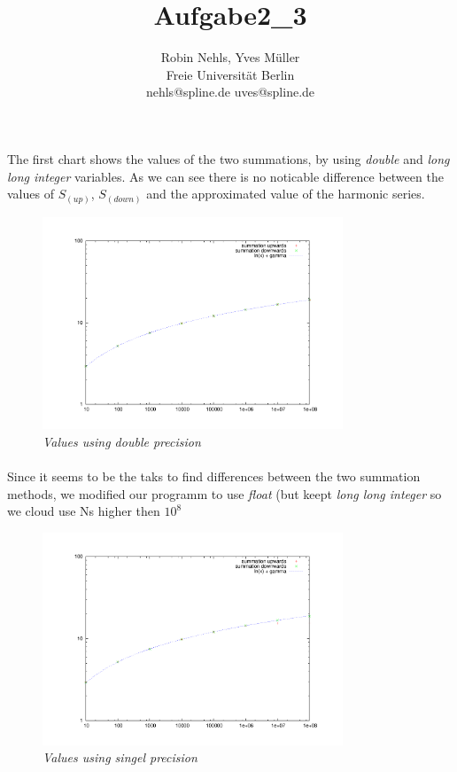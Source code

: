 \documentclass[11pt,a4paper,notitlepage,onecolumn]{article}
\title{Aufgabe2\_3}
\author{Robin Nehls, Yves Müller\\
  Freie Universit\"at Berlin\\
  nehls@spline.de uves@spline.de }
\date{}
\begin{document}
\maketitle

\paragraph{} The first chart shows the values of the two summations, by 
using {\em double} and {\em long long integer} variables. As we can see
there is no noticable difference between the values of 
$S_{(up)}$, $S_{(down)}$ and the approximated value 
of the harmonic series.

\begin{figure}[!h]
\centering
\includegraphics[width=0.8\textwidth]{aufgabe2-3-double.pdf}
\caption{\em \small Values using double precision}
\end{figure}

\paragraph{} Since it seems to be the taks to find differences between the 
two summation methods, we modified our programm to use {\em float} (but 
keept {\em long long integer} so we cloud use Ns higher then $10^{8}$

\begin{figure}
\centering
\includegraphics[width=0.8\textwidth]{aufgabe2-3-float.pdf}
\caption{\em \small Values using singel precision}
\end{figure}
\end{document}
